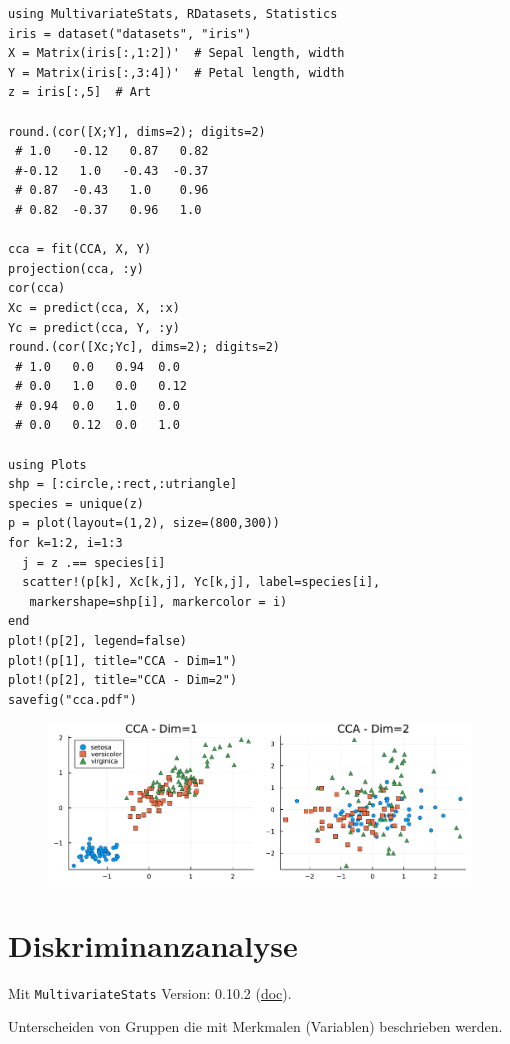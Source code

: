 \documentclass[10pt,twocolumn]{scrartcl}
\begin{document}
\begin{lstlisting}
using MultivariateStats, RDatasets, Statistics
iris = dataset("datasets", "iris")
X = Matrix(iris[:,1:2])'  # Sepal length, width
Y = Matrix(iris[:,3:4])'  # Petal length, width
z = iris[:,5]  # Art

round.(cor([X;Y], dims=2); digits=2)
 # 1.0   -0.12   0.87   0.82
 #-0.12   1.0   -0.43  -0.37
 # 0.87  -0.43   1.0    0.96
 # 0.82  -0.37   0.96   1.0

cca = fit(CCA, X, Y)
projection(cca, :y)
cor(cca)
Xc = predict(cca, X, :x)
Yc = predict(cca, Y, :y)
round.(cor([Xc;Yc], dims=2); digits=2)
 # 1.0   0.0   0.94  0.0
 # 0.0   1.0   0.0   0.12
 # 0.94  0.0   1.0   0.0
 # 0.0   0.12  0.0   1.0

using Plots
shp = [:circle,:rect,:utriangle]
species = unique(z)
p = plot(layout=(1,2), size=(800,300))
for k=1:2, i=1:3
  j = z .== species[i]
  scatter!(p[k], Xc[k,j], Yc[k,j], label=species[i],
   markershape=shp[i], markercolor = i)
end
plot!(p[2], legend=false)
plot!(p[1], title="CCA - Dim=1")
plot!(p[2], title="CCA - Dim=2")
savefig("cca.pdf")
\end{lstlisting}

\begin{figure}[ht]
  \centering
  \includegraphics[width=.95\columnwidth]{cca.pdf}
\end{figure}

\section{Diskriminanzanalyse}

Mit \lstinline|MultivariateStats| Version: 0.10.2
(\href{https://juliastats.org/MultivariateStats.jl/stable/lda/}{doc}).

Unterscheiden von Gruppen die mit Merkmalen (Variablen) beschrieben werden.
\end{document}
